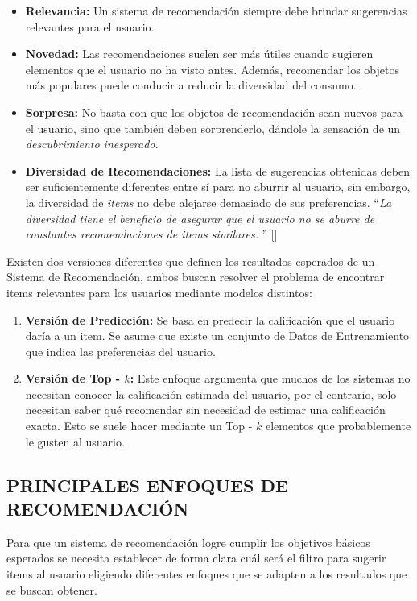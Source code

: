 \begin{itemize}
    \item \textbf{Relevancia: }Un sistema de recomendación siempre debe brindar sugerencias relevantes para el usuario.
    \item \textbf{Novedad: }  Las recomendaciones suelen ser más útiles cuando sugieren elementos que el usuario no ha visto antes. Además, recomendar los objetos más populares puede conducir a reducir la diversidad del consumo.
    \item \textbf{Sorpresa: } No basta con que los objetos de recomendación sean nuevos para el usuario, sino que también deben sorprenderlo, dándole la sensación de un \textit{descubrimiento inesperado.}
    
    \item \textbf{Diversidad de Recomendaciones: } La lista de sugerencias obtenidas deben ser suficientemente diferentes entre sí para no aburrir al usuario, sin embargo, la diversidad de \textit{items} no debe alejarse demasiado de sus preferencias.
   \enquote{\textit{La diversidad tiene el beneficio de asegurar que el usuario no se aburre de constantes recomendaciones de items similares. }} [\cite{Aggarwal2016}]
\end{itemize}

\newpage

Existen dos versiones diferentes que definen los resultados esperados de un Sistema de Recomendación, ambos buscan resolver el problema de encontrar items relevantes para los usuarios mediante modelos distintos:


\begin{enumerate}
    \item \textbf{Versión de Predicción: } Se basa en predecir la calificación que el usuario daría a un item. Se asume que existe un conjunto de Datos de Entrenamiento que indica las preferencias del usuario.
    \item \textbf{Versión de Top - $k$: } Este enfoque argumenta que muchos de los sistemas no necesitan conocer la calificación estimada del usuario, por el contrario, solo necesitan saber qué recomendar sin necesidad de estimar una calificación exacta. Esto se suele hacer mediante un Top - $k$ elementos que probablemente le gusten al usuario.
\end{enumerate}

\subsection{PRINCIPALES ENFOQUES DE RECOMENDACIÓN }
Para que un sistema de recomendación logre cumplir los objetivos básicos esperados se necesita establecer de forma clara cuál será el filtro para sugerir items al usuario eligiendo diferentes enfoques que se adapten a los resultados que se buscan obtener.

